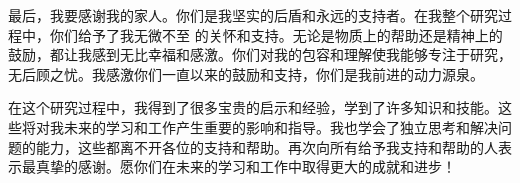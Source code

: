 最后，我要感谢我的家人。你们是我坚实的后盾和永远的支持者。在我整个研究过程中，你们给予了我无微不至
的关怀和支持。无论是物质上的帮助还是精神上的鼓励，都让我感到无比幸福和感激。你们对我的包容和理解使我能够专注于研究，无后顾之忧。我感激你们一直以来的鼓励和支持，你们是我前进的动力源泉。

在这个研究过程中，我得到了很多宝贵的启示和经验，学到了许多知识和技能。这些将对我未来的学习和工作产生重要的影响和指导。我也学会了独立思考和解决问题的能力，这些都离不开各位的支持和帮助。再次向所有给予我支持和帮助的人表示最真挚的感谢。愿你们在未来的学习和工作中取得更大的成就和进步！





